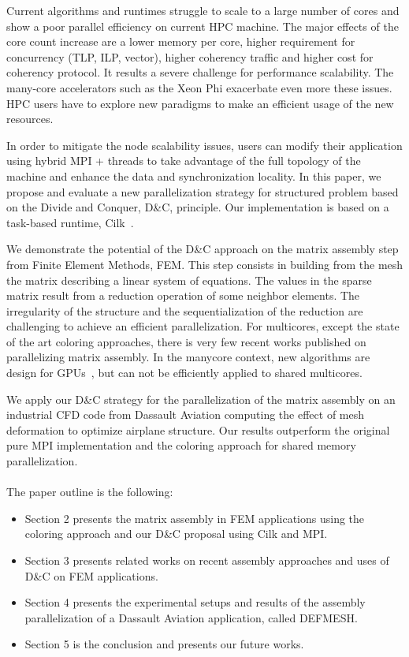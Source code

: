 \documentclass{IOS-Book-Article}
\begin{document}
Current algorithms and runtimes struggle to scale to a large number of cores and show a poor parallel efficiency on current HPC machine. 
The major effects of the core count increase are a lower memory per core, higher requirement for concurrency (TLP, ILP, vector), higher coherency traffic and higher cost
for coherency protocol.
It results a severe challenge for performance scalability. The many-core accelerators such as the Xeon Phi exacerbate even more these issues.
HPC users have to explore new paradigms to make an efficient usage of the new resources. 

In order to mitigate the node scalability issues, users can modify their application using hybrid MPI + threads to take advantage of the full topology of the machine
and enhance the data and synchronization locality.
In this paper, we propose and evaluate a new parallelization strategy for structured problem based on the Divide and Conquer, D\&C, principle. Our implementation is based on a task-based runtime,
Cilk~\cite{cilk5}. 

We demonstrate the potential of the D\&C approach on the matrix assembly step from Finite Element Methods, FEM.
This step consists in building from the mesh the matrix describing a linear system of equations.
The values in the sparse matrix result from a reduction operation of some neighbor elements.
The irregularity of the structure and the sequentialization of the reduction are challenging to achieve an efficient parallelization.
For multicores, except the state of the art coloring approaches, there is very few recent works published on parallelizing matrix assembly.
In the manycore context, new algorithms are design for GPUs~\cite{cecka2011assembly,CPUGPUasm}, but can not be efficiently applied to shared multicores.

We apply our D\&C strategy for the parallelization of the matrix assembly on an industrial CFD code from Dassault Aviation computing the effect of mesh deformation
to optimize airplane structure.
Our results outperform the original pure MPI implementation and the coloring approach for shared memory parallelization.
\\\\
The paper outline is the following:
\begin{itemize}
\item Section 2 presents the matrix assembly in FEM applications using the coloring approach and our D\&C proposal using Cilk and MPI.
\item Section 3 presents related works on recent assembly approaches and uses of D\&C on FEM applications.
\item Section 4 presents the experimental setups and results of the assembly parallelization of a Dassault Aviation application, called DEFMESH.
\item Section 5 is the conclusion and presents our future works.
\end{itemize}
\end{document}
